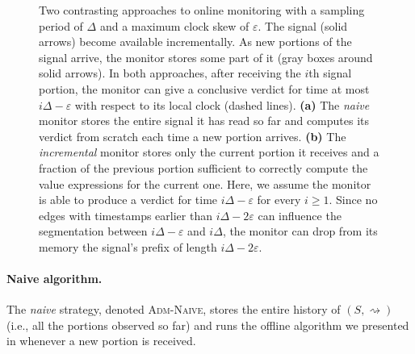 \documentclass[iicol,lineno]{sn-jnl}
\renewcommand{\cref}{\Cref}
\newcommand{\hb}{\rightsquigarrow}
\newcommand{\?}{\text{?}}
\begin{document}
\begin{figure}
\begin{subfigure}[c]{.42\textwidth}
		\end{subfigure}
		\vspace{1ex}
		\caption{\bgroup \color{red}
			Two contrasting approaches to online monitoring with a sampling period of $\Delta$ and a maximum clock skew of $\varepsilon$. The signal (solid arrows) become available incrementally. As new portions of the signal arrive, the monitor stores some part of it (gray boxes around solid arrows). In both approaches, after receiving the $i$th signal portion, the monitor can give a conclusive verdict for time at most $i\Delta-\varepsilon$ with respect to its local clock (dashed lines).
			\textbf{(a)} The \emph{naive} monitor stores the entire signal it has read so far and computes its verdict from scratch each time a new portion arrives.
			\textbf{(b)} The \emph{incremental} monitor stores only the current portion it receives and a fraction of the previous portion sufficient to correctly compute the value expressions for the current one. Here, we assume the monitor is able to produce a verdict for time $i\Delta-\varepsilon$ for every $i \geq 1$. Since no edges with timestamps earlier than $i\Delta-2\varepsilon$ can influence the segmentation between $i\Delta-\varepsilon$ and $i\Delta$, the monitor can drop from its memory the signal's prefix of length $i\Delta-2\varepsilon$. \egroup\label{fig:online}}
	\end{figure}
	
	
	\paragraph*{Naive algorithm.}
	The \emph{naive} strategy, denoted \textsc{Adm-Naive}, stores the entire history of $(S,{\hb})$ (i.e., all the portions observed so far) and runs the offline algorithm we presented in \cref{sec:offline} whenever a new portion is received.
	
\end{document}
